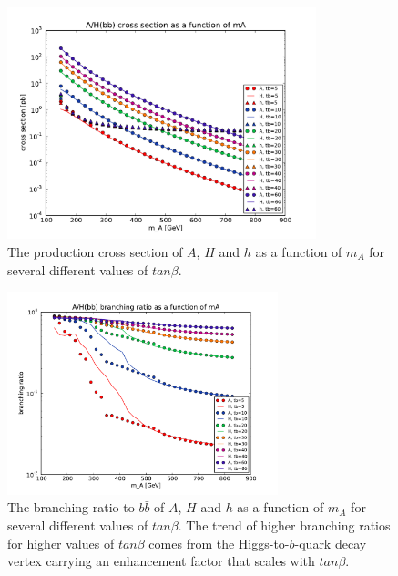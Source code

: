 \begin{figure}
	\centering
	\includegraphics[width=0.8\textwidth]{Theory/figures/mssm_xsec/AH_xsec_vs_mass.pdf}
	\caption{The production cross section of $A$, $H$ and $h$ as a function of $m_A$ for several different values of $tan\beta$. \label{fig:xsec_vs_mass} }
\end{figure}




\begin{figure}
	\centering
	\includegraphics[width=0.7\textwidth]{Theory/figures/mssm_xsec/AH_br_vs_mass.pdf}
	\caption{The branching ratio to $b\bar{b}$ of $A$, $H$ and $h$ as a function of $m_A$ for several different values of $tan\beta$. The trend of higher branching ratios for higher values of $tan\beta$ comes from the Higgs-to-$b$-quark decay vertex carrying an enhancement factor that scales with $tan\beta$.\label{fig:br_vs_mass} }
\end{figure}


